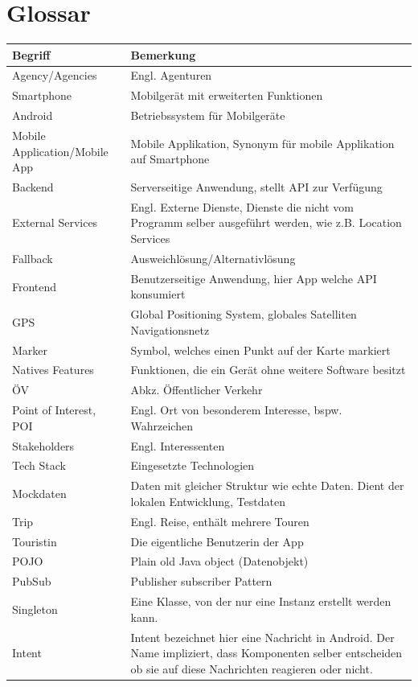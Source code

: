 \documentclass[a4paper,10pt,xetex]{article}
\begin{document}
\section{Glossar}\label{glossar}
\begin{longtabu} to \textwidth { | l | X[l] | }
\hline
\textbf{Begriff} & \textbf{Bemerkung}\\\hline
\endhead

Agency/Agencies & Engl. Agenturen\\\hline
Smartphone & Mobilgerät mit erweiterten Funktionen\\\hline
Android & Betriebssystem für Mobilgeräte\\\hline
Mobile Application/Mobile App & Mobile Applikation, Synonym für mobile Applikation auf Smartphone\\\hline
Backend & Serverseitige Anwendung, stellt API zur Verfügung\\\hline
External Services & Engl. Externe Dienste, Dienste die nicht vom Programm selber ausgeführt werden, wie z.B. Location Services\\\hline
Fallback & Ausweichlösung/Alternativlösung\\\hline
Frontend & Benutzerseitige Anwendung, hier App welche API konsumiert\\\hline
GPS & Global Positioning System, globales Satelliten Navigationsnetz\\\hline
Marker & Symbol, welches einen Punkt auf der Karte markiert\\\hline
Natives Features & Funktionen, die ein Gerät ohne weitere Software besitzt\\\hline
ÖV & Abkz. Öffentlicher Verkehr\\\hline
Point of Interest, POI & Engl. Ort von besonderem Interesse, bspw. Wahrzeichen\\\hline
Stakeholders & Engl. Interessenten\\\hline
Tech Stack & Eingesetzte Technologien\\\hline
Mockdaten & Daten mit gleicher Struktur wie echte Daten. Dient der lokalen Entwicklung, Testdaten \\\hline
Trip & Engl. Reise, enthält mehrere Touren\\\hline
Touristin & Die eigentliche Benutzerin der App\\\hline
POJO & Plain old Java object (Datenobjekt)\\\hline
PubSub & Publisher subscriber Pattern\\\hline
Singleton & Eine Klasse, von der nur eine Instanz erstellt werden kann.\\\hline
Intent & Intent bezeichnet hier eine Nachricht in Android. Der Name impliziert, dass Komponenten selber entscheiden ob sie auf diese Nachrichten reagieren oder nicht.\\\hline
\end{longtabu}
\end{document}

